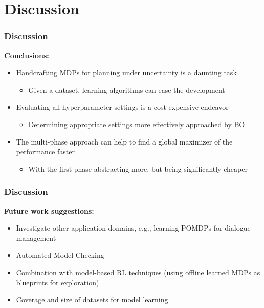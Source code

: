 \section{Discussion}

\begin{frame}
\frametitle{Discussion}

\textbf{\textcolor{tudblue}{Conclusions:}}

\begin{itemize}\setlength\itemsep{1em}
	\item<1-> Handcrafting MDPs for planning under uncertainty is a daunting task
	\begin{itemize}
		\item Given a dataset, learning algorithms can ease the development
	\end{itemize}
	\item<2-> Evaluating all hyperparameter settings is a cost-expensive endeavor
	\begin{itemize}
		\item Determining appropriate settings more effectively approached by BO
	\end{itemize}
	\item<3-> The multi-phase approach can help to find a global maximizer of the performance faster
	\begin{itemize}
		\item With the first phase abstracting more, but being significantly cheaper
	\end{itemize}
\end{itemize}


\end{frame}

\begin{frame}
	\frametitle{Discussion}
	
	\textbf{\textcolor{tudblue}{Future work suggestions:}}
	
	\begin{itemize}
		\item<1-> Investigate other application domains, e.g., learning POMDPs for dialogue management \cite{chinaei2011}
		\item<2-> Automated Model Checking \cite{lacerda2015optimal}
		\vspace{20pt}
		\item<3-> Combination with model-based RL techniques {(using offline learned MDPs as blueprints for exploration)}
		\item<4-> Coverage and size of datasets for model learning
	\end{itemize}
\end{frame}